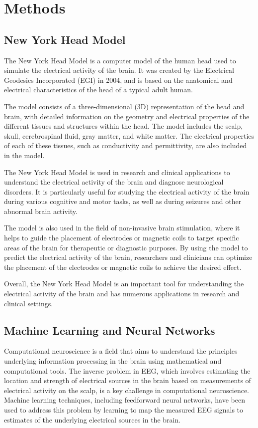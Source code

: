 \documentclass[a4paper, UKenglish, 11pt]{uiomaster}
\begin{document}
\chapter{Methods}
\section{New York Head Model}
The New York Head Model is a computer model of the human head used to simulate the electrical activity of the brain. It was created by the Electrical Geodesics Incorporated (EGI) in 2004, and is based on the anatomical and electrical characteristics of the head of a typical adult human.

The model consists of a three-dimensional (3D) representation of the head and brain, with detailed information on the geometry and electrical properties of the different tissues and structures within the head. The model includes the scalp, skull, cerebrospinal fluid, gray matter, and white matter. The electrical properties of each of these tissues, such as conductivity and permittivity, are also included in the model.

The New York Head Model is used in research and clinical applications to understand the electrical activity of the brain and diagnose neurological disorders. It is particularly useful for studying the electrical activity of the brain during various cognitive and motor tasks, as well as during seizures and other abnormal brain activity.

The model is also used in the field of non-invasive brain stimulation, where it helps to guide the placement of electrodes or magnetic coils to target specific areas of the brain for therapeutic or diagnostic purposes. By using the model to predict the electrical activity of the brain, researchers and clinicians can optimize the placement of the electrodes or magnetic coils to achieve the desired effect.

Overall, the New York Head Model is an important tool for understanding the electrical activity of the brain and has numerous applications in research and clinical settings.

\section{Machine Learning and Neural Networks}
Computational neuroscience is a field that aims to understand the principles underlying information processing in the brain using mathematical and computational tools. The inverse problem in EEG, which involves estimating the location and strength of electrical sources in the brain based on measurements of electrical activity on the scalp, is a key challenge in computational neuroscience. Machine learning techniques, including feedforward neural networks, have been used to address this problem by learning to map the measured EEG signals to estimates of the underlying electrical sources in the brain.
\end{document}
